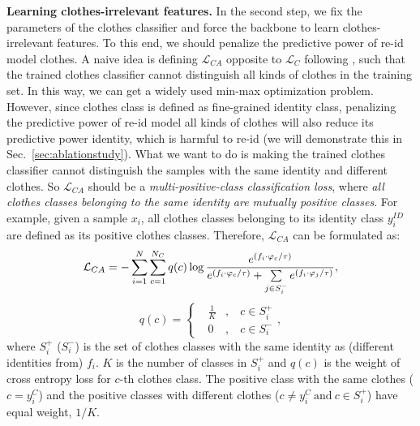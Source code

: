 \documentclass[10pt,twocolumn,letterpaper]{article}
\begin{document}
\medskip
\noindent
\textbf{Learning clothes-irrelevant features.} 
In the second step, we fix the parameters of the clothes classifier and force the backbone to learn clothes-irrelevant features. 
To this end, we should penalize the predictive power of re-id model \wrt clothes. 
A naive idea is defining $\mathcal{L}_{CA}$ opposite to $\mathcal{L}_C$ following \cite{Wang2019LearningRobust}, such that the trained clothes classifier cannot distinguish all kinds of clothes in the training set.
In this way, we can get a widely used min-max optimization problem.
However, since clothes class is defined as fine-grained identity class, penalizing the predictive power of re-id model \wrt all kinds of clothes will also reduce its predictive power \wrt identity, which is harmful to re-id (we will demonstrate this in Sec.~\ref{sec:ablationstudy}).
What we want to do is making the trained clothes classifier cannot distinguish the samples with the same identity and different clothes.
So $\mathcal{L}_{CA}$ should be a \emph{multi-positive-class classification loss}, where \emph{all clothes classes belonging to the same identity are mutually positive classes}.
For example, given a sample $x_i$, all clothes classes belonging to its identity class $y_i^{ID}$ are defined as its positive clothes classes.
Therefore, $\mathcal{L}_{CA}$ can be formulated as:
\begin{equation}\label{eq:CAloss}
	\small
	\mathcal{L}_{CA}=-\sum\limits_{i=1}^N \sum\limits_{c=1}^{N_C} q(c) \log \frac{ e^{(f_i\cdot \varphi_c/\tau)}}{e^{(f_i\cdot \varphi_c/\tau)}+\sum\limits_{j\in S^-_i} e^{(f_i\cdot \varphi_j/\tau)}},
\end{equation}
\begin{equation}\label{eq:q1}
	q(c)=\left\{
	\begin{aligned}
		&\frac{1}{K}  &, & \ c\in S_i^+ \\
		&0 &, & \ c\in S_i^-
	\end{aligned}
	\right.,
\end{equation}
where $S_i^+$  ($S_i^-$) is the set of clothes classes with the same identity as (different identities from) $f_i$.
$K$ is the number of classes in $S_i^+$ and $q(c)$ is the weight of cross entropy loss for $c$-th clothes class.
The positive class with the same clothes ($c=y_i^C$) and the positive classes with different clothes ($c\ne y_i^C \ \text{and} \ c\in S_i^+$) have equal weight, \ie $1/K$.
\end{document}
